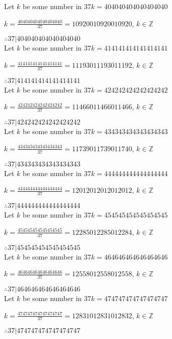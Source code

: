 \documentclass{article}
\begin{document}
Let $k$ be some number in $37k = 404040404040404040$

$k = \frac{404040404040404040}{37} = 10920010920010920$, $k \in \mathbb{Z}$

$ \therefore  37|404040404040404040 $ \\

Let $k$ be some number in $37k = 414141414141414141$

$k = \frac{414141414141414141}{37} = 11193011193011192$, $k \in \mathbb{Z}$

$ \therefore  37|414141414141414141 $ \\

Let $k$ be some number in $37k = 424242424242424242$

$k = \frac{424242424242424242}{37} = 11466011466011466$, $k \in \mathbb{Z}$

$ \therefore  37|424242424242424242 $ \\

Let $k$ be some number in $37k = 434343434343434343$

$k = \frac{434343434343434343}{37} = 11739011739011740$, $k \in \mathbb{Z}$

$ \therefore  37|434343434343434343 $ \\

Let $k$ be some number in $37k = 444444444444444444$

$k = \frac{444444444444444444}{37} = 12012012012012012$, $k \in \mathbb{Z}$

$ \therefore  37|444444444444444444 $ \\

Let $k$ be some number in $37k = 454545454545454545$

$k = \frac{454545454545454545}{37} = 12285012285012284$, $k \in \mathbb{Z}$

$ \therefore  37|454545454545454545 $ \\

Let $k$ be some number in $37k = 464646464646464646$

$k = \frac{464646464646464646}{37} = 12558012558012558$, $k \in \mathbb{Z}$

$ \therefore  37|464646464646464646 $ \\

Let $k$ be some number in $37k = 474747474747474747$

$k = \frac{474747474747474747}{37} = 12831012831012832$, $k \in \mathbb{Z}$

$ \therefore  37|474747474747474747 $ \\
\end{document}

